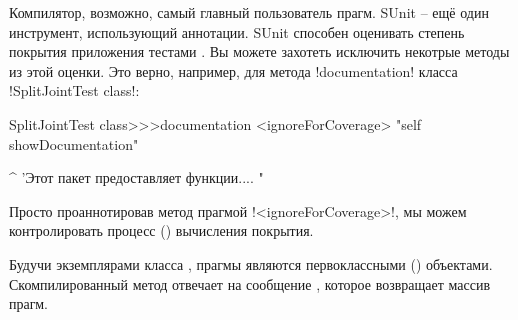\documentclass[a4paper,10pt,twoside]{book}
\begin{document}
Компилятор, возможно, самый главный пользователь прагм. SUnit -- ещё один инструмент, использующий аннотации. SUnit способен оценивать степень покрытия приложения тестами . Вы можете захотеть исключить некотрые методы из этой оценки. Это верно, например, для метода \ct!documentation! класса \ct!SplitJointTest class!:

\begin{code}{}
SplitJointTest class>>>documentation
	<ignoreForCoverage>
	"self showDocumentation"
	
	^ 'Этот пакет предоставляет функции.... "
\end{code}

Просто проаннотировав метод прагмой \ct!<ignoreForCoverage>!, мы можем контролировать процесс () вычисления покрытия.


%	


Будучи экземплярами класса , прагмы являются первоклассными () объектами. Скомпилированный метод отвечает на сообщение , которое возвращает массив прагм.
\end{document}
